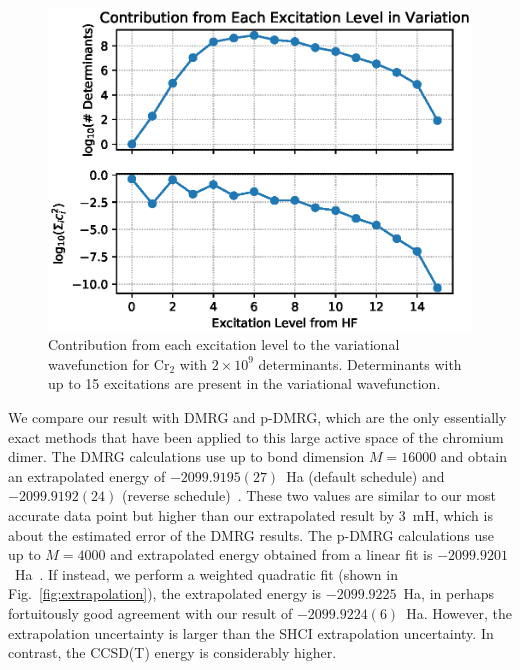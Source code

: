 \documentclass[%
preprint,
 superscriptaddress,
 amsmath,amssymb,
 aps,
]{revtex4-1}
\begin{document}
\begin{figure}
  \includegraphics[width=\linewidth]{excitation/excitation.eps}
  \caption{Contribution from each excitation level to the variational wavefunction for Cr$_2$ with $2 \times 10^9$ determinants.
  Determinants with up to 15 excitations are present in the variational wavefunction.
}
  \label{fig:excit}
\end{figure}

We compare our result with DMRG and p-DMRG, which are the only essentially exact methods that have been applied to this large active space of the chromium dimer.
The DMRG calculations use up to bond dimension $M=16000$ and obtain an extrapolated energy of $-2099.9195(27)$~Ha (default schedule) and $-2099.9192(24)$ (reverse schedule)~\cite{GuoLiCha-JCTC-18}.
These two values are similar to our most accurate data point but higher than our extrapolated result by 3~mH, which is about the estimated error of the DMRG results.
The p-DMRG calculations use up to $M=4000$ and extrapolated energy obtained from a linear fit is $-2099.9201$~Ha~\cite{GuoLiCha-JCTC-18}.
If instead, we perform a weighted quadratic fit (shown in Fig.~\ref{fig:extrapolation}), the extrapolated energy is $-2099.9225$~Ha,
in perhaps fortuitously good agreement with our result of $-2099.9224(6)$~Ha.  However, the extrapolation uncertainty is larger than the SHCI extrapolation uncertainty.
In contrast, the CCSD(T) energy is considerably higher.
\end{document}
